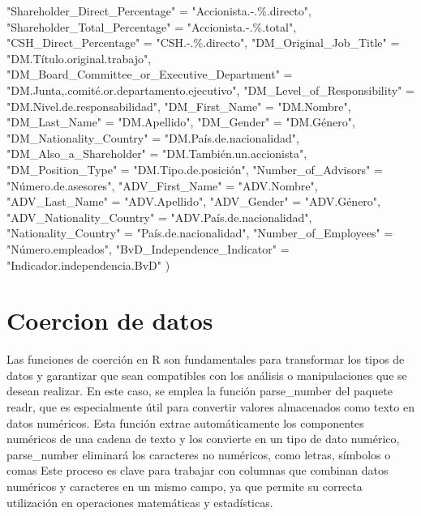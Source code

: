 \documentclass[
]{article}
\newenvironment{Shaded}{\begin{snugshade}}{\end{snugshade}}
\newcommand{\NormalTok}[1]{#1}
\newcommand{\OtherTok}[1]{\textcolor[rgb]{0.56,0.35,0.01}{#1}}
\newcommand{\StringTok}[1]{\textcolor[rgb]{0.31,0.60,0.02}{#1}}
\begin{document}
\begin{Shaded}
\begin{Highlighting}[]
    \StringTok{"Shareholder\_Direct\_Percentage"} \OtherTok{=} \StringTok{"Accionista.{-}.\%.directo"}\NormalTok{,}
    \StringTok{"Shareholder\_Total\_Percentage"} \OtherTok{=} \StringTok{"Accionista.{-}.\%.total"}\NormalTok{,}
    \StringTok{"CSH\_Direct\_Percentage"} \OtherTok{=} \StringTok{"CSH.{-}.\%.directo"}\NormalTok{,}
    \StringTok{"DM\_Original\_Job\_Title"} \OtherTok{=} \StringTok{"DM.Título.original.trabajo"}\NormalTok{,}
    \StringTok{"DM\_Board\_Committee\_or\_Executive\_Department"} \OtherTok{=} 
      \StringTok{"DM.Junta,.comité.or.departamento.ejecutivo"}\NormalTok{,}
    \StringTok{"DM\_Level\_of\_Responsibility"} \OtherTok{=} \StringTok{"DM.Nivel.de.responsabilidad"}\NormalTok{,}
    \StringTok{"DM\_First\_Name"} \OtherTok{=} \StringTok{"DM.Nombre"}\NormalTok{,}
    \StringTok{"DM\_Last\_Name"} \OtherTok{=} \StringTok{"DM.Apellido"}\NormalTok{,}
    \StringTok{"DM\_Gender"} \OtherTok{=} \StringTok{"DM.Género"}\NormalTok{,}
    \StringTok{"DM\_Nationality\_Country"} \OtherTok{=} \StringTok{"DM.País.de.nacionalidad"}\NormalTok{,}
    \StringTok{"DM\_Also\_a\_Shareholder"} \OtherTok{=} \StringTok{"DM.También.un.accionista"}\NormalTok{,}
    \StringTok{"DM\_Position\_Type"} \OtherTok{=} \StringTok{"DM.Tipo.de.posición"}\NormalTok{,}
    \StringTok{"Number\_of\_Advisors"} \OtherTok{=} \StringTok{"Número.de.asesores"}\NormalTok{,}
    \StringTok{"ADV\_First\_Name"} \OtherTok{=} \StringTok{"ADV.Nombre"}\NormalTok{,}
    \StringTok{"ADV\_Last\_Name"} \OtherTok{=} \StringTok{"ADV.Apellido"}\NormalTok{,}
    \StringTok{"ADV\_Gender"} \OtherTok{=} \StringTok{"ADV.Género"}\NormalTok{,}
    \StringTok{"ADV\_Nationality\_Country"} \OtherTok{=} \StringTok{"ADV.País.de.nacionalidad"}\NormalTok{,}
    \StringTok{"Nationality\_Country"} \OtherTok{=} \StringTok{"País.de.nacionalidad"}\NormalTok{,}
    \StringTok{"Number\_of\_Employees"} \OtherTok{=} \StringTok{"Número.empleados"}\NormalTok{,}
    \StringTok{"BvD\_Independence\_Indicator"} \OtherTok{=} \StringTok{"Indicador.independencia.BvD"}
\NormalTok{  )}
\end{Highlighting}
\end{Shaded}

\section{Coercion de datos}\label{coercion-de-datos}

Las funciones de coerción en R son fundamentales para transformar los
tipos de datos y garantizar que sean compatibles con los análisis o
manipulaciones que se desean realizar. En este caso, se emplea la
función parse\_number del paquete readr, que es especialmente útil para
convertir valores almacenados como texto en datos numéricos. Esta
función extrae automáticamente los componentes numéricos de una cadena
de texto y los convierte en un tipo de dato numérico, parse\_number
eliminará los caracteres no numéricos, como letras, símbolos o comas
Este proceso es clave para trabajar con columnas que combinan datos
numéricos y caracteres en un mismo campo, ya que permite su correcta
utilización en operaciones matemáticas y estadísticas.
\end{document}
